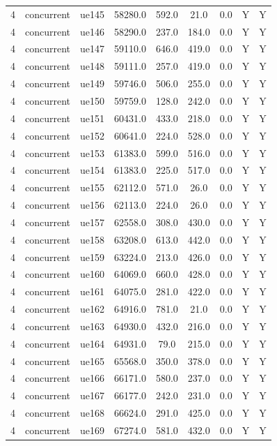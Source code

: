 \begin{table}[ht]
\begin{tabular}{|c|c|c|c|c|c|c|c|c|}
4 & concurrent & ue145 & 58280.0 & 592.0 & 21.0 & 0.0 & Y & Y \\
4 & concurrent & ue146 & 58290.0 & 237.0 & 184.0 & 0.0 & Y & Y \\
4 & concurrent & ue147 & 59110.0 & 646.0 & 419.0 & 0.0 & Y & Y \\
4 & concurrent & ue148 & 59111.0 & 257.0 & 419.0 & 0.0 & Y & Y \\
4 & concurrent & ue149 & 59746.0 & 506.0 & 255.0 & 0.0 & Y & Y \\
4 & concurrent & ue150 & 59759.0 & 128.0 & 242.0 & 0.0 & Y & Y \\
4 & concurrent & ue151 & 60431.0 & 433.0 & 218.0 & 0.0 & Y & Y \\
4 & concurrent & ue152 & 60641.0 & 224.0 & 528.0 & 0.0 & Y & Y \\
4 & concurrent & ue153 & 61383.0 & 599.0 & 516.0 & 0.0 & Y & Y \\
4 & concurrent & ue154 & 61383.0 & 225.0 & 517.0 & 0.0 & Y & Y \\
4 & concurrent & ue155 & 62112.0 & 571.0 & 26.0 & 0.0 & Y & Y \\
4 & concurrent & ue156 & 62113.0 & 224.0 & 26.0 & 0.0 & Y & Y \\
4 & concurrent & ue157 & 62558.0 & 308.0 & 430.0 & 0.0 & Y & Y \\
4 & concurrent & ue158 & 63208.0 & 613.0 & 442.0 & 0.0 & Y & Y \\
4 & concurrent & ue159 & 63224.0 & 213.0 & 426.0 & 0.0 & Y & Y \\
4 & concurrent & ue160 & 64069.0 & 660.0 & 428.0 & 0.0 & Y & Y \\
4 & concurrent & ue161 & 64075.0 & 281.0 & 422.0 & 0.0 & Y & Y \\
4 & concurrent & ue162 & 64916.0 & 781.0 & 21.0 & 0.0 & Y & Y \\
4 & concurrent & ue163 & 64930.0 & 432.0 & 216.0 & 0.0 & Y & Y \\
4 & concurrent & ue164 & 64931.0 & 79.0 & 215.0 & 0.0 & Y & Y \\
4 & concurrent & ue165 & 65568.0 & 350.0 & 378.0 & 0.0 & Y & Y \\
4 & concurrent & ue166 & 66171.0 & 580.0 & 237.0 & 0.0 & Y & Y \\
4 & concurrent & ue167 & 66177.0 & 242.0 & 231.0 & 0.0 & Y & Y \\
4 & concurrent & ue168 & 66624.0 & 291.0 & 425.0 & 0.0 & Y & Y \\
4 & concurrent & ue169 & 67274.0 & 581.0 & 432.0 & 0.0 & Y & Y \\

\end{tabular}
\end{table}
